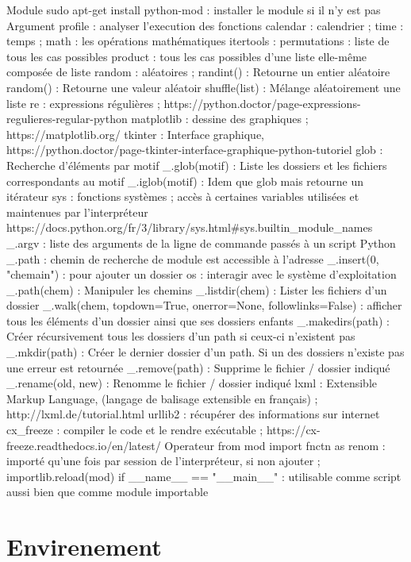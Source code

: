 \documentclass[a4paper,12pt]{report}
\begin{document}
Module
	sudo apt-get install python-mod : installer le module si il n'y est pas
	Argument
		profile : analyser l'execution des fonctions
		calendar : calendrier ;
		time : temps ;
		math : les opérations mathématiques
		itertools :
			permutations : liste de tous les cas possibles
			product : tous les cas possibles d'une liste elle-même composée de liste
		random : aléatoires ;
			randint() : Retourne un entier aléatoire
			random() : Retourne une valeur aléatoir
			shuffle(list) : Mélange aléatoirement une liste
		re : expressions régulières ; https://python.doctor/page-expressions-regulieres-regular-python
		matplotlib : dessine des graphiques ; https://matplotlib.org/
		tkinter : Interface graphique, https://python.doctor/page-tkinter-interface-graphique-python-tutoriel
		glob : Recherche d'éléments par motif
			\_.glob(motif) : Liste les dossiers et les fichiers correspondants au motif
			\_.iglob(motif) : Idem que glob mais retourne un itérateur
		sys : fonctions systèmes ; accès à certaines variables utilisées et maintenues par l'interpréteur
			https://docs.python.org/fr/3/library/sys.html\#sys.builtin\_module\_names
			\_.argv : liste des arguments de la ligne de commande passés à un script Python
			\_.path : chemin de recherche de module est accessible à l'adresse
				\_.insert(0, "chemain") : pour ajouter un dossier
		os : interagir avec le système d'exploitation
			\_.path(chem) : Manipuler les chemins
			\_.listdir(chem) : Lister les fichiers d'un dossier
			\_.walk(chem, topdown=True, onerror=None, followlinks=False) : afficher tous les éléments d'un dossier ainsi que ses dossiers enfants
			\_.makedirs(path) : Créer récursivement tous les dossiers d'un path si ceux-ci n'existent pas
			\_.mkdir(path) : Créer le dernier dossier d'un path. Si un des dossiers n'existe pas une erreur est retournée
			\_.remove(path) : Supprime le fichier / dossier indiqué
			\_.rename(old, new) : Renomme le fichier / dossier indiqué
		lxml : Extensible Markup Language, (langage de balisage extensible en français) ; http://lxml.de/tutorial.html
		urllib2 : récupérer des informations sur internet
		cx\_freeze : compiler le code et le rendre exécutable ; https://cx-freeze.readthedocs.io/en/latest/
	Operateur
		from mod import fnctn as renom : importé qu’une fois par session de l’interpréteur, si non ajouter ; importlib.reload(mod)
		if \_\_name\_\_ == "\_\_main\_\_" : utilisable comme script aussi bien que comme module importable
\section{Envirenement}
\end{document}
